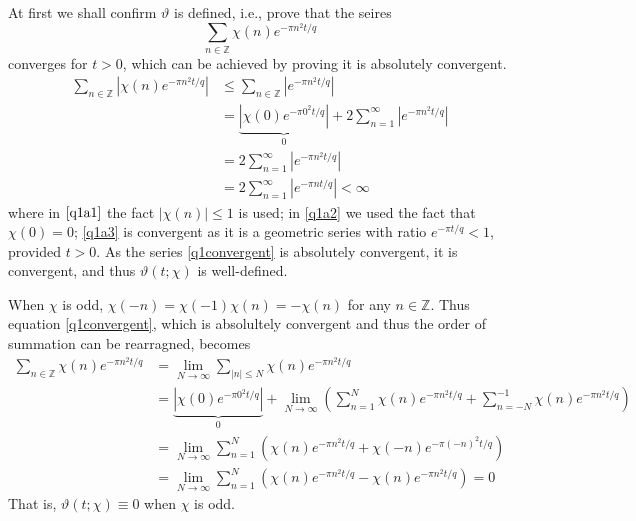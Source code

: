 \documentclass{article}
\theoremstyle{definition}
\theoremstyle{definition}
\theoremstyle{remark}
\newcommand{\bb}[1]{\mathbb{#1}} %
\begin{document}
At first we shall confirm $\vartheta$ is defined, i.e., prove that the seires
\begin{equation}
	\sum_{n \in \mathbb{Z}} \chi(n) e^{-\pi n^2 t/q} \label{q1convergent}
\end{equation}
converges for $t > 0$, which can be achieved by proving it is absolutely convergent.
\begin{align}
	\sum_{n \in \mathbb{Z}} \left|\chi(n) e^{-\pi n^2 t/q}\right| 
	&\leq \sum_{n \in \mathbb{Z}} \left|e^{-\pi n^2 t/q}\right| \label{q1a1}\\
	&= \underbrace{\left|\chi(0)e^{-\pi 0^2 t/q}\right|}_{0} +
	2 \sum_{n = 1}^{\infty} \left|e^{-\pi n^2 t/q}\right| \\ 
	&= 2 \sum_{n = 1}^{\infty} \left|e^{-\pi n^2 t/q}\right| \label{q1a2} \\ 
	&= 2 \sum_{n = 1}^{\infty} \left|e^{-\pi n t/q}\right| < \infty \label{q1a3}
\end{align}
where in $\eqref{q1a1}$ the fact $|\chi(n)| \leq 1$ is used; in \eqref{q1a2} we used the fact that $\chi(0) = 0$; \eqref{q1a3} is convergent as it is a geometric series with ratio $e^{-\pi t/q} < 1$, provided $t > 0$.
As the series \eqref{q1convergent} is absolutely convergent, it is convergent, and thus $\vartheta(t;\chi)$ is well-defined.

When $\chi$ is odd, $\chi(-n) = \chi(-1) \chi(n) = - \chi(n)$ for any $n \in \bb{Z}$. 
Thus equation \eqref{q1convergent}, which is absolultely convergent and thus the order of summation can be rearragned, becomes
\begin{align}
	\sum_{n \in \mathbb{Z}} \chi(n) e^{-\pi n^2 t/q} 
	&= \lim_{N \rightarrow  \infty}\sum_{|n| \leq N } \chi(n) e^{-\pi n^2 t/q} 
	\\
	&= \underbrace{\left|\chi(0)e^{-\pi 0^2 t/q}\right|}_{0} + \lim_{N \rightarrow  \infty} \left(
	\sum_{n = 1}^{N} \chi(n) e^{-\pi n^2 t/q} + \sum_{n = -N}^{-1} \chi(n) e^{-\pi n^2 t/q}  \right) 
	\\
	&= \lim_{N \rightarrow  \infty} \sum_{n = 1}^{N} \left(\chi(n) e^{-\pi n^2 t/q} +  \chi(-n) e^{-\pi (-n)^2 t/q}\right) 
	\\
	&= \lim_{N \rightarrow  \infty} \sum_{n = 1}^{N} \left(\chi(n) e^{-\pi n^2 t/q} -  \chi(n) e^{-\pi n^2 t/q}\right) = 0
\end{align}
That is, $\vartheta(t;\chi) \equiv 0$ when $\chi$ is odd.
\end{document}
